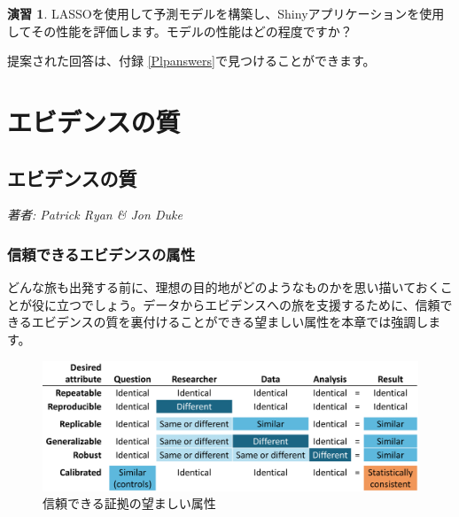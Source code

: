 \documentclass[
  11pt]{book}
\theoremstyle{definition}
\theoremstyle{definition}
\theoremstyle{definition}
\newtheorem{exercise}{演習}[chapter]
\theoremstyle{definition}
\theoremstyle{remark}
\begin{document}
\begin{exercise}
\protect\hypertarget{exr:exercisePlp3}{}\label{exr:exercisePlp3}LASSOを使用して予測モデルを構築し、Shinyアプリケーションを使用してその性能を評価します。モデルの性能はどの程度ですか？
\end{exercise}

提案された回答は、付録 \ref{Plpanswers}で見つけることができます。

\part{エビデンスの質}\label{part-ux30a8ux30d3ux30c7ux30f3ux30b9ux306eux8cea}

\chapter{エビデンスの質}\label{EvidenceQuality}

\emph{著者: Patrick Ryan \& Jon Duke}


\section{信頼できるエビデンスの属性}\label{ux4fe1ux983cux3067ux304dux308bux30a8ux30d3ux30c7ux30f3ux30b9ux306eux5c5eux6027}

どんな旅も出発する前に、理想の目的地がどのようなものかを思い描いておくことが役に立つでしょう。データからエビデンスへの旅を支援するために、信頼できるエビデンスの質を裏付けることができる望ましい属性を本章では強調します。

\begin{figure}

{\centering \includegraphics[width=1\linewidth]{images/EvidenceQuality/reliableevidenceattributes} 

}

\caption{信頼できる証拠の望ましい属性}\label{fig:attributesOfEvidence}
\end{figure}
\end{document}
